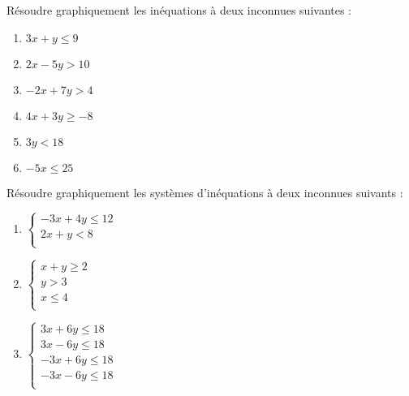 \begin{exercice}
Résoudre graphiquement les inéquations à deux inconnues suivantes :
\begin{multicols}{3}
\begin{enumerate}
\item $3x+y\le 9$
\item $2x-5y>10$
\item $-2x+7y>4$
\item $4x+3y\ge -8$
\item $3y<18$
\item $-5x\le 25$
\end{enumerate}
\end{multicols}
\end{exercice}


\begin{exercice}
Résoudre graphiquement les systèmes d'inéquations à deux inconnues suivants :
\begin{multicols}{3}
\begin{enumerate}
\item $\left\{ \begin{matrix}
   -3x+4y\le 12  \\
   2x+y<8\,\,\,\,\,\,\,  \\
\end{matrix} \right.$
\item $\left\{ \begin{matrix}
   x+y\ge 2  \\
   y>3\,\,\,\,\,\,\,\,  \\
   x\le 4\,\,\,\,\,\,\,\,  \\
\end{matrix} \right.$
\item $\left\{ \begin{matrix}
   3x+6y\le 18  \\
   3x-6y\le 18  \\
   -3x+6y\le 18  \\
   -3x-6y\le 18  \\
\end{matrix} \right.$
\end{enumerate}
\end{multicols}
\end{exercice}
